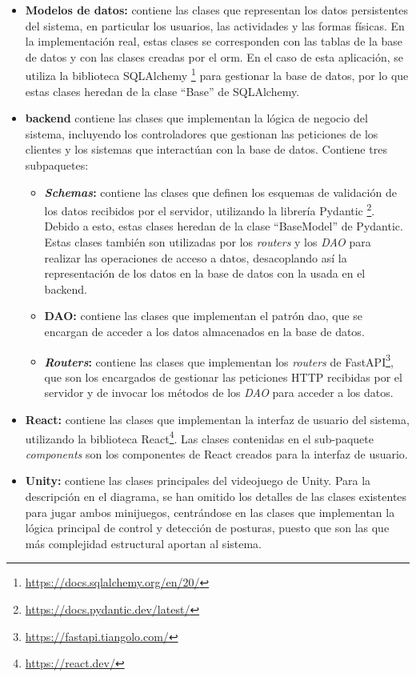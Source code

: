 \begin{itemize}
    \item \textbf{Modelos de datos:} contiene las clases que representan los datos persistentes del
        sistema, en particular los usuarios, las actividades y las formas físicas. En la implementación
        real, estas clases se corresponden con las tablas de la base de datos y con las clases creadas
        por el \gls{orm}. En el caso de esta aplicación, se utiliza la biblioteca SQLAlchemy%
        \footnote{\url{https://docs.sqlalchemy.org/en/20/}} para gestionar la base de datos, por lo que
        estas clases heredan de la clase \enquote{Base} de SQLAlchemy.
    \item \textbf{\Gls{backend}} contiene las clases que implementan la lógica de negocio del sistema, incluyendo
        los controladores que gestionan las peticiones de los clientes y los sistemas que interactúan con
        la base de datos. Contiene tres subpaquetes:
        \begin{itemize}
            \item \textbf{\textit{Schemas}:} contiene las clases que definen los esquemas de validación
                de los datos recibidos por el servidor, utilizando la librería Pydantic%
                \footnote{\url{https://docs.pydantic.dev/latest/}}. Debido a esto, estas clases
                heredan de la clase \enquote{BaseModel} de Pydantic.
                Estas clases también son utilizadas por los \textit{routers} y los \textit{DAO}
                para realizar las operaciones de acceso a datos, desacoplando así la
                representación de los datos en la base de datos con la usada en el \gls{backend}.
            \item \textbf{DAO:} contiene las clases que implementan el patrón \gls{dao}, que
                se encargan de acceder a los datos almacenados en la base de datos.
            \item \textbf{\textit{Routers}:} contiene las clases que implementan los \textit{routers} de
                FastAPI\footnote{\url{https://fastapi.tiangolo.com/}}, que son los encargados
                de gestionar las peticiones HTTP recibidas por el servidor y de invocar los métodos
                de los \textit{DAO} para acceder a los datos.
        \end{itemize}
    \item \textbf{React:} contiene las clases que implementan la interfaz de usuario del sistema,
        utilizando la biblioteca React\footnote{\url{https://react.dev/}}. Las clases
        contenidas en el sub-paquete \textit{components} son los componentes de React
        creados para la interfaz de usuario.
    \item \textbf{Unity:} contiene las clases principales del videojuego de Unity. Para la descripción
        en el diagrama, se han omitido los detalles de las clases existentes para jugar ambos minijuegos,
        centrándose en las clases que implementan la lógica principal de control y detección de posturas,
        puesto que son las que más complejidad estructural aportan al sistema.
\end{itemize}

